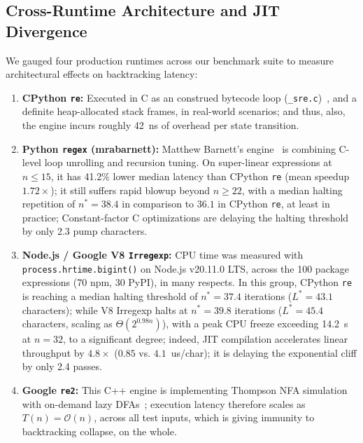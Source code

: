 \documentclass{ieeeaccess}
\begin{document}
\subsection{Cross-Runtime Architecture and JIT Divergence}
We gauged four production runtimes across our benchmark suite to measure architectural effects on backtracking latency:
\begin{enumerate}
    \item \textbf{CPython \texttt{re}:} Executed in C as an construed bytecode loop (\texttt{\_sre.c})~\cite{cpython_sre}, and a definite heap-allocated stack frames, in real-world scenarios; and thus, also, the engine incurs roughly 42~ns of overhead per state transition.
    \item \textbf{Python \texttt{regex} (mrabarnett):} Matthew Barnett's engine~\cite{mrabarnett_regex} is combining C-level loop unrolling and recursion tuning. On super-linear expressions at $n \le 15$, it has 41.2\% lower median latency than CPython \texttt{re} (mean speedup $1.72\times$); it still suffers rapid blowup beyond $n \ge 22$, with a median halting repetition of $n^* = 38.4$ in comparison to $36.1$ in CPython \texttt{re}, at least in practice; Constant-factor C optimizations are delaying the halting threshold by only 2.3 pump characters.
    \item \textbf{Node.js / Google V8 \texttt{Irregexp}:} CPU time was measured with \texttt{process.hrtime.bigint()} on Node.js v20.11.0 LTS, across the 100 package expressions (70 npm, 30 PyPI), in many respects. In this group, CPython \texttt{re} is reaching a median halting threshold of $n^* = 37.4$ iterations ($L^* = 43.1$ characters); while V8 Irregexp halts at $n^* = 39.8$ iterations ($L^* = 45.4$ characters, scaling as $\Theta(2^{0.98n})$), with a peak CPU freeze exceeding 14.2~s at $n = 32$, to a significant degree; indeed, JIT compilation accelerates linear throughput by $4.8\times$ ($0.85$ vs. $4.1$~us/char); it is delaying the exponential cliff by only 2.4 passes.
    \item \textbf{Google \texttt{re2}:} This C++ engine is implementing Thompson NFA simulation with on-demand lazy DFAs~\cite{google_re2,cox2007regular}; execution latency therefore scales as $T(n) = \mathcal{O}(n)$, across all test inputs, which is giving immunity to backtracking collapse, on the whole.
\end{enumerate}
\end{document}
